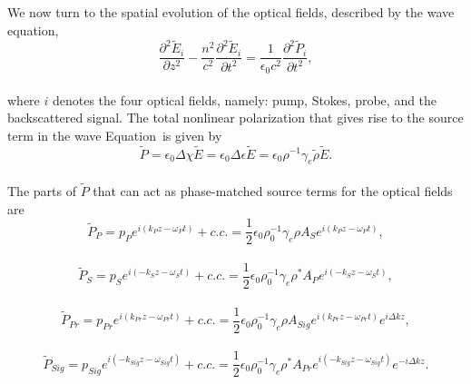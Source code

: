 We now turn to the spatial evolution of the optical fields, described by the wave equation,
\\
\begin{equation}
    \frac{\partial^{2}\tilde{E}_{i}}{\partial z^{2}} - \frac{n^{2}}{c^{2}}\frac{\partial^{2}\tilde{E}_{i}}{\partial t^{2}} = \frac{1}{\epsilon_{0}c^{2}}\frac{\partial^{2}\tilde{P}_{i}}{\partial t^{2}},
    \label{eq:Wave equation}
\end{equation}
\\
where \(i\) denotes the four optical fields, namely: pump, Stokes, probe, and the backscattered signal. The total nonlinear polarization that gives rise to the source term in the wave Equation~is given by
\\
\begin{equation}
    \tilde{P} = \epsilon_{0}\Delta\chi\tilde{E} = \epsilon_{0}\Delta\epsilon\tilde{E} = \epsilon_{0}\rho^{-1}\gamma_{e}\tilde{\rho}\tilde{E}.
\end{equation}
\\
The parts of \(\tilde{P}\) that can act as phase-matched source terms for the optical fields are
\\
\begin{equation}
    \tilde{P}_{P} = p_{P}e^{i(k_{P}z - \omega_{P} t)} + c.c. = \frac{1}{2}\epsilon_{0}\rho_{0}^{-1}\gamma_{e}\rho A_{S}e^{i(k_{P}z - \omega_{P} t)},
    \label{eq:Pump phase-matched source term}
\end{equation}
\\
\begin{equation}
    \tilde{P}_{S} = p_{S}e^{i(-k_{S}z - \omega_{S} t)} + c.c. = \frac{1}{2}\epsilon_{0}\rho_{0}^{-1}\gamma_{e}\rho^{*} A_{P}e^{i(-k_{S}z - \omega_{S} t)},
    \label{eq:Stokes phase-matched source term}
\end{equation}
\\
\begin{equation}
    \tilde{P}_{Pr} = p_{Pr}e^{i(k_{Pr}z - \omega_{Pr} t)} + c.c. = \frac{1}{2}\epsilon_{0}\rho_{0}^{-1}\gamma_{e}\rho A_{Sig}e^{i(k_{Pr}z - \omega_{Pr} t)}e^{i\Delta kz},
    \label{eq:Probe phase-matched source term}
\end{equation}
\\
\begin{equation}
    \tilde{P}_{Sig} = p_{Sig}e^{i(-k_{Sig}z - \omega_{Sig} t)} + c.c. = \frac{1}{2}\epsilon_{0}\rho_{0}^{-1}\gamma_{e}\rho^{*} A_{Pr}e^{i(-k_{Sig}z - \omega_{Sig} t)}e^{-i\Delta kz}.
    \label{eq:Signal phase-matched source term}
\end{equation}
